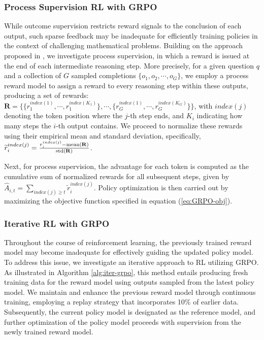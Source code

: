 \begin{itemize}[topsep=0pt]
\subsubsection{Process Supervision RL with GRPO}  
While outcome supervision restricts reward signals to the conclusion of each output, such sparse feedback may be inadequate for efficiently training policies in the context of challenging mathematical problems. Building on the approach proposed in \cite{wang2023math}, we investigate process supervision, in which a reward is issued at the end of each intermediate reasoning step. More precisely, for a given question $q$ and a collection of $G$ sampled completions $\{o_1, o_2, \cdots, o_G\}$, we employ a process reward model to assign a reward to every reasoning step within these outputs, producing a set of rewards: $\mathbf{R} = \{ \{r_1^{index(1)},\cdots,r_1^{index(K_1)}\}, \cdots,  \{r_G^{index(1)},\cdots,r_G^{index(K_G)}\} \}$, with $index(j)$ denoting the token position where the $j$-th step ends, and $K_i$ indicating how many steps the $i$-th output contains. We proceed to normalize these rewards using their empirical mean and standard deviation, specifically, $\widetilde{r}_i^{index(j)} = \frac{r_i^{index(j)} - {\rm mean(\mathbf{R})}}{{\rm std(\mathbf{R})}}$.

Next, for process supervision, the advantage for each token is computed as the cumulative sum of normalized rewards for all subsequent steps, given by $\hat{A}_{i, t} = \sum_{index(j) \ge t} \widetilde{r}_i^{index(j)}$. Policy optimization is then carried out by maximizing the objective function specified in equation (\ref{eq:GRPO-obj}).

\subsubsection{Iterative RL with GRPO} Throughout the course of reinforcement learning, the previously trained reward model may become inadequate for effectively guiding the updated policy model. To address this issue, we investigate an iterative approach to RL utilizing GRPO. As illustrated in Algorithm \ref{alg:iter-grpo}, this method entails producing fresh training data for the reward model using outputs sampled from the latest policy model. We maintain and enhance the previous reward model through continuous training, employing a replay strategy that incorporates 10\% of earlier data. Subsequently, the current policy model is designated as the reference model, and further optimization of the policy model proceeds with supervision from the newly trained reward model.


\end{itemize}
